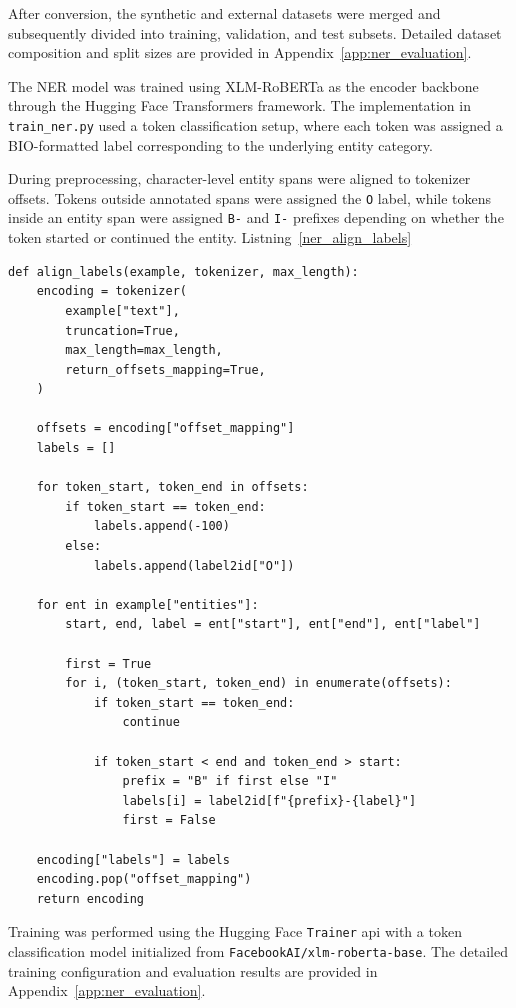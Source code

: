 After conversion, the synthetic and external datasets were merged and subsequently divided into training, validation, and test subsets. Detailed dataset composition and split sizes are provided in Appendix~\ref{app:ner_evaluation}.


The NER model was trained using XLM-RoBERTa as the encoder backbone through the Hugging Face Transformers framework. The implementation in \texttt{train\_ner.py} used a token classification setup, where each token was assigned a BIO-formatted label corresponding to the underlying entity category.

During preprocessing, character-level entity spans were aligned to tokenizer offsets. Tokens outside annotated spans were assigned the \texttt{O} label, while tokens inside an entity span were assigned \texttt{B-} and \texttt{I-} prefixes depending on whether the token started or continued the entity.
Listning~\ref{ner_align_labels}
\begin{lstlisting}[caption={Span-to-token alignment for BIO labeling}, label={lst:ner_align_labels}]
def align_labels(example, tokenizer, max_length):
    encoding = tokenizer(
        example["text"],
        truncation=True,
        max_length=max_length,
        return_offsets_mapping=True,
    )

    offsets = encoding["offset_mapping"]
    labels = []

    for token_start, token_end in offsets:
        if token_start == token_end:
            labels.append(-100)
        else:
            labels.append(label2id["O"])

    for ent in example["entities"]:
        start, end, label = ent["start"], ent["end"], ent["label"]

        first = True
        for i, (token_start, token_end) in enumerate(offsets):
            if token_start == token_end:
                continue

            if token_start < end and token_end > start:
                prefix = "B" if first else "I"
                labels[i] = label2id[f"{prefix}-{label}"]
                first = False

    encoding["labels"] = labels
    encoding.pop("offset_mapping")
    return encoding
\end{lstlisting}

Training was performed using the Hugging Face \texttt{Trainer} \acrshort{api} with a token classification model initialized from \texttt{FacebookAI/xlm-roberta-base}. The detailed training configuration and evaluation results are provided in Appendix~\ref{app:ner_evaluation}.

